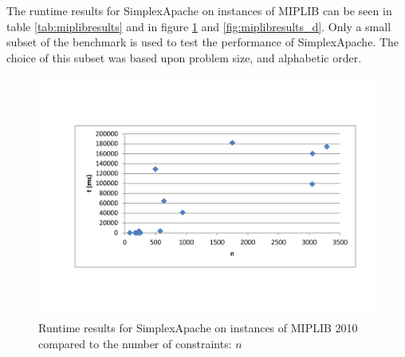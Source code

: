 \documentclass[nocopyrightspace]{acm_proc_article-sp}
\begin{document}
The runtime results for SimplexApache on instances of MIPLIB can be seen in table \ref{tab:miplibresults} and in figure \ref{fig:miplibresults_n} and \ref{fig:miplibresults_d}. Only a small subset of the benchmark is used to test the performance of SimplexApache. The choice of this subset was based upon problem size, and alphabetic order. 

\begin{figure}[h!]
\includegraphics[width=\columnwidth]{../Results/miplib_apache_n.pdf}
\caption{Runtime results for SimplexApache on instances of MIPLIB 2010 \cite{KochEtAl2011} compared to the number of constraints: $n$}
\label{fig:miplibresults_n}
\end{figure}
\end{document}
